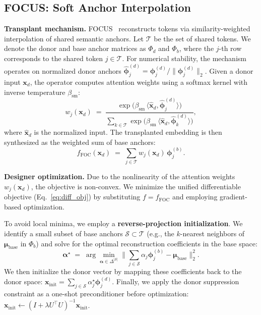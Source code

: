 \subsection{FOCUS: Soft Anchor Interpolation}
\label{sec:focus-breaker}

\noindent\textbf{Transplant mechanism.}
FOCUS~\citep{dobler2023focus} reconstructs tokens via similarity-weighted interpolation of shared semantic anchors.
Let $\mathcal{T}$ be the set of shared tokens. We denote the donor and base anchor matrices as $\Phi_d$ and $\Phi_b$, where the $j$-th row corresponds to the shared token $j \in \mathcal{T}$.
For numerical stability, the mechanism operates on normalized donor anchors $\widehat{\boldsymbol{\phi}}^{(d)}_j = \boldsymbol{\phi}^{(d)}_j / \|\boldsymbol{\phi}^{(d)}_j\|_2$.
Given a donor input $\mathbf{x}_d$, the operator computes attention weights using a softmax kernel with inverse temperature $\beta_{\mathrm{sm}}$:
\begin{equation}
\label{eq:focus_w}
w_j(\mathbf{x}_d)
\;=\;
\frac{\exp\!\big(\beta_{\mathrm{sm}}\,\langle \widehat{\mathbf{x}}_d, \widehat{\boldsymbol{\phi}}^{(d)}_j\rangle\big)}
{\sum_{k\in\mathcal{T}} \exp\!\big(\beta_{\mathrm{sm}}\,\langle \widehat{\mathbf{x}}_d, \widehat{\boldsymbol{\phi}}^{(d)}_k\rangle\big)},
\end{equation}
where $\widehat{\mathbf{x}}_d$ is the normalized input. The transplanted embedding is then synthesized as the weighted sum of base anchors:
\begin{equation}
\label{eq:focus_func}
f_{\text{FOC}}(\mathbf{x}_d)
\;=\;
\sum_{j\in\mathcal{T}} w_j(\mathbf{x}_d)\,\boldsymbol{\phi}^{(b)}_j.
\end{equation}

\noindent\textbf{Designer optimization.}
Due to the nonlinearity of the attention weights $w_j(\mathbf{x}_d)$, the objective is non-convex.
We minimize the unified differentiable objective (Eq.~\ref{eq:diff_obj}) by substituting $f=f_{\text{FOC}}$ and employing gradient-based optimization.

To avoid local minima, we employ a \textbf{reverse-projection initialization}. We identify a small subset of base anchors $\mathcal{S}\subset\mathcal{T}$ (e.g., the $k$-nearest neighbors of $\boldsymbol{\mu}_{\text{base}}$ in $\Phi_b$) and solve for the optimal reconstruction coefficients in the base space:
\begin{equation}
\label{eq:focus_init_ls}
\boldsymbol{\alpha}^\star
\;=\;
\arg\min_{\boldsymbol{\alpha}\in\Delta^{|\mathcal{S}|}}
\Big\|\sum_{j\in\mathcal{S}} \alpha_j \boldsymbol{\phi}^{(b)}_j - \boldsymbol{\mu}_{\text{base}}\Big\|_2^2.
\end{equation}
We then initialize the donor vector by mapping these coefficients back to the donor space: $\mathbf{x}_{\text{init}} = \sum_{j\in\mathcal{S}} \alpha^\star_j \boldsymbol{\phi}^{(d)}_j$.
Finally, we apply the donor suppression constraint as a one-shot preconditioner before optimization: $\mathbf{x}_{\text{init}} \leftarrow (I+\lambda U^\top U)^{-1}\mathbf{x}_{\text{init}}$.
